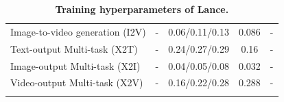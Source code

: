 \begin{table}[t]
\begin{tabular}{p{6.8cm}!{\vrule width 0.6pt}c c c c}
Image-to-video generation (I2V) & - & 0.06/0.11/0.13 & 0.086 & - \\
Text-output Multi-task  (X2T) & - &  0.24/0.27/0.29 & 0.16 & - \\ %
Image-output Multi-task (X2I) & - & 0.04/0.05/0.08 & 0.032 & -\\
Video-output Multi-task (X2V) & - & 0.16/0.22/0.28 & 0.288 & - \\
\fi
\bottomrule
\end{tabular}
\caption{\textbf{Training hyperparameters of Lance.} %
}
\label{Tab_train}
\end{table}


